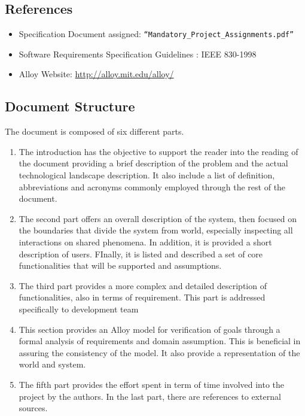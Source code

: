 \subsection{References}


\begin{itemize}
	\item Specification Document assigned: \texttt{“Mandatory\_Project\_Assignments.pdf”}
	\item Software Requirements Specification Guidelines : IEEE 830-1998
	\item Alloy Website: \url{http://alloy.mit.edu/alloy/}
\end{itemize}

\subsection{Document Structure}

The document is composed of six different parts.

\begin{enumerate}
	
	\item The introduction has the objective to support the reader into the reading of the document providing a brief description of the problem and the actual technological landscape description. It also include a list of definition, abbreviations and acronyms commonly employed through the rest of the document.
	\item The second part offers an overall description of the system, then focused on the boundaries that divide the system from world, especially inspecting all interactions on shared phenomena. In addition, it is provided a short description of users. FInally, it is listed and described a set of core functionalities that will be supported and assumptions.
	\item The third part provides a more complex and detailed description of functionalities, also in terms of requirement. This part is addressed specifically to development team
	\item This section provides an Alloy model for verification of goals through a formal analysis of requirements and domain assumption. This is beneficial in assuring the consistency of the model. It also provide a representation of the world and system.
	\item The fifth part provides the effort spent in term of time involved into the project by the authors.
	In the last part, there are references to external sources.
	
\end{enumerate}

